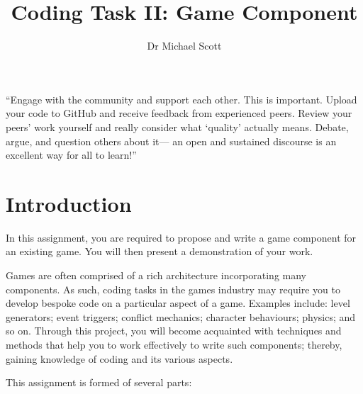 \documentclass{../fal_assignment}
\title{Coding Task II: Game Component}
\author{Dr Michael Scott}
\begin{document}
\maketitle
\begin{marginquote}
    ``Engage with the community and support each other. This is important.
    Upload your code to GitHub and receive feedback from experienced peers.
    Review your peers' work yourself and really consider what `quality' actually means.
    Debate, argue, and question others about it---
    an open and sustained discourse is an excellent way for all to learn!''
\end{marginquote}

\section*{Introduction}

In this assignment, you are required to propose and write a game component for an existing game. You will then present a demonstration of your work.

Games are often comprised of a rich architecture incorporating many components. As such, coding tasks in the games industry may require you to develop bespoke code on a particular aspect of a game. Examples include: level generators; event triggers; conflict mechanics; character behaviours; physics; and so on. Through this project, you will become acquainted with techniques and methods that help you to work effectively to write such components; thereby, gaining knowledge of coding and its various aspects.

This assignment is formed of several parts:
\end{document}
